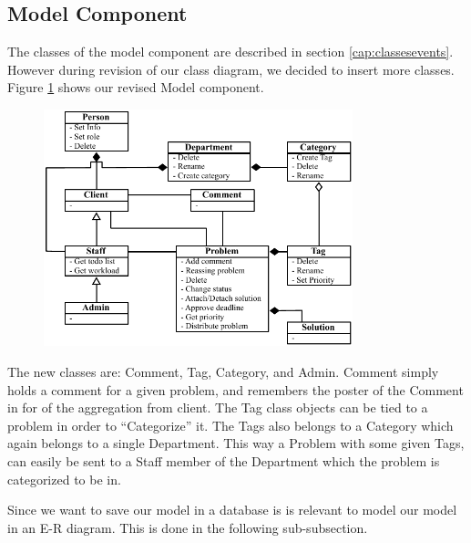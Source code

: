 \subsection{Model Component}
\label{sub:modelComponent}
The classes of the model component are described in section \ref{cap:classesevents}.
However during revision of our class diagram, we decided to insert more classes.
Figure \ref{fig:modelComponent} shows our revised Model component.

\begin{figure}[hbt]
	\centering
		\includegraphics[width=0.80\textwidth]{input/component_design/Modelcomponent.pdf}
	\label{fig:modelComponent}
\end{figure}

The new classes are: Comment, Tag, Category, and Admin.
Comment simply holds a comment for a given problem, and remembers the poster of the Comment in for of the aggregation from client.
The Tag class objects can be tied to a problem in order to ``Categorize'' it.
The Tags also belongs to a Category which again belongs to a single Department.
This way a Problem with some given Tags, can easily be sent to a Staff member of the Department which the problem is categorized to be in.

Since we want to save our model in a database is is relevant to model our model in an E-R diagram.
This is done in the following sub-subsection.
